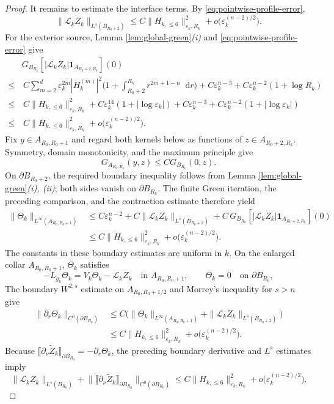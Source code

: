 \documentclass[11pt]{article}
\numberwithin{equation}{section}
\theoremstyle{remark}
\newcommand{\dd}{\mathop{}\!\mathrm{d}}
\begin{document}
\begin{proof}
It remains to estimate the interface terms.  By \eqref{eq:pointwise-profile-error},
{
\[
 \|\mathcal L_kZ_k\|_{L^s(B_{R_0+2})}
 \le C\|H_{k,\le6}\|_{\varepsilon_k,R_k}^2
 +o\bigl(\varepsilon_k^{(n-2)/2}\bigr).
\]
}
 For the exterior source, Lemma  \ref{lem:global-green}\emph{(i)} and
\eqref{eq:pointwise-profile-error} give
{
\[
\begin{aligned}
&G_{B_{R_k}}
 [|\mathcal L_kZ_k|\mathbf1_{A_{R_0+2,R_k}}](0)\\
 \le &\,C\sum_{m=2}^d\varepsilon_k^{2m}|H_k^{(m)}|^2
 \bigg(1+\int_{R_0+2}^{R_k}r^{2m+1-n}\dd r\bigg)
 +C\varepsilon_k^{n-3}
 +C\varepsilon_k^{n-2}(1+\log R_k)\\
 \le &\,C\|H_{k,\le6}\|_{\varepsilon_k,R_k}^2
 +C\varepsilon_k^{14}(1+|\log\varepsilon_k|)
 +C\varepsilon_k^{n-3}
 +C\varepsilon_k^{n-2}(1+|\log\varepsilon_k|)\\
 \le &\,C\|H_{k,\le6}\|_{\varepsilon_k,R_k}^2
 +o\bigl(\varepsilon_k^{(n-2)/2}\bigr).
\end{aligned}
\]
}
 Fix $y\in A_{R_0,R_0+1}$ and regard both kernels below as functions of
$z\in A_{R_0+2,R_k}$.  Symmetry, domain monotonicity, and the maximum
principle give
{
\[
 G_{A_{R_0,R_k}}(y,z)\le CG_{B_{R_k}}(0,z).
\]
}
 On $\partial B_{R_0+2}$, the required boundary inequality follows from
Lemma  \ref{lem:global-green}\emph{(i), (ii)}; both sides vanish on
$\partial B_{R_k}$.  The finite Green iteration, the preceding comparison,
and the contraction estimate therefore yield
{
\[
\begin{aligned}
 \|\Theta_k\|_{L^\infty(A_{R_0,R_0+1})}
 &\le C\varepsilon_k^{n-2}
 +C\|\mathcal L_kZ_k\|_{L^s(B_{R_0+2})}+C\,G_{B_{R_k}}
 [|\mathcal L_kZ_k|\mathbf1_{A_{R_0+2,R_k}}](0)\\
 &\le C\|H_{k,\le6}\|_{\varepsilon_k,R_k}^2
 +o\bigl(\varepsilon_k^{(n-2)/2}\bigr).
\end{aligned}
\]
}
 The constants in these boundary estimates are uniform
in $k$.  On the enlarged collar $A_{R_0,R_0+1}$, $\Theta_k$ satisfies
{
\[
 -L_{g_k}\Theta_k=V_k\Theta_k-\mathcal L_kZ_k
 \quad\text{in }A_{R_0,R_0+1},
 \qquad
 \Theta_k=0\quad\text{on }\partial B_{R_0},
\]
}
 The boundary $W^{2,s}$ estimate
on $A_{R_0,R_0+1/2}$ and Morrey's inequality for $s>n$ give
{
\[
\begin{aligned}
 \|\partial_r\Theta_k\|_{C^0(\partial B_{R_0})}
 &\le C\bigl(
 \|\Theta_k\|_{L^\infty(A_{R_0,R_0+1})}
 +\|\mathcal L_kZ_k\|_{L^s(B_{R_0+2})}\bigr)\\
 &\le C\|H_{k,\le6}\|_{\varepsilon_k,R_k}^2
 +o\bigl(\varepsilon_k^{(n-2)/2}\bigr).
\end{aligned}
\]
}
 Because
$\llbracket\partial_\nu\widetilde Z_k\rrbracket_{\partial B_{R_0}}
=-\partial_r\Theta_k$, the preceding boundary derivative and
$L^s$ estimates imply
{
\[
 \|\mathcal L_kZ_k\|_{L^s(B_{R_0})}
 +\big\|\llbracket\partial_\nu\widetilde Z_k\rrbracket_{\partial B_{R_0}}
 \big\|_{C^0(\partial B_{R_0})}
 \le C\|H_{k,\le6}\|_{\varepsilon_k,R_k}^2
 +o\bigl(\varepsilon_k^{(n-2)/2}\bigr).
\]
}
 \end{proof}
\end{document}
